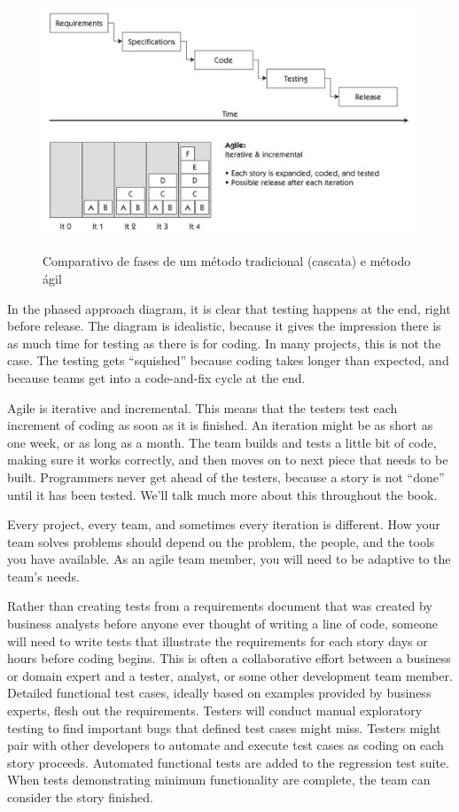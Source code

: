 \documentclass[
	12pt,				%
	openright,			%
	oneside,			%
	a4paper,			%
	english,			%
	brazil,				%
	]{abntex2}
\begin{document}
\begin{figure}[H]
    \centering
    \caption{Comparativo de fases de um método tradicional (cascata) e método ágil}
    \graphicspath{ {./graphics/agile/} }
    \includegraphics[scale=1.0]{waterfall-vs-agile}
    \label{fig:waterfall-vs-agile}
\end{figure}

In the phased approach diagram, it is clear that testing happens at the end, right before release. The diagram is idealistic, because it gives the impression there is as much time for testing as there is for coding. In many projects, this is not the case. The testing gets “squished” because coding takes longer than expected, and because teams get into a code-and-fix cycle at the end.

Agile is iterative and incremental. This means that the testers test each increment of coding as soon as it is finished. An iteration might be as short as one week, or as long as a month. The team builds and tests a little bit of code, making sure it works correctly, and then moves on to next piece that needs to be built. Programmers never get ahead of the testers, because a story is not “done” until it has been tested. We’ll talk much more about this throughout the book.

Every project, every team, and sometimes every iteration is different. How your team solves problems should depend on the problem, the people, and the tools you have available. As an agile team member, you will need to be adaptive to the team’s needs.

Rather than creating tests from a requirements document that was created by business analysts before anyone ever thought of writing a line of code, someone will need to write tests that illustrate the requirements for each story days or hours before coding begins. This is often a collaborative effort between a business or domain expert and a tester, analyst, or some other development team member. Detailed functional test cases, ideally based on examples provided by business experts, flesh out the requirements. Testers will conduct manual exploratory testing to find important bugs that defined test cases might miss. Testers might pair with other developers to automate and execute test cases as coding on each story proceeds. Automated functional tests are added to the regression test suite. When tests demonstrating minimum functionality are complete, the team can consider the story finished.
\end{document}
